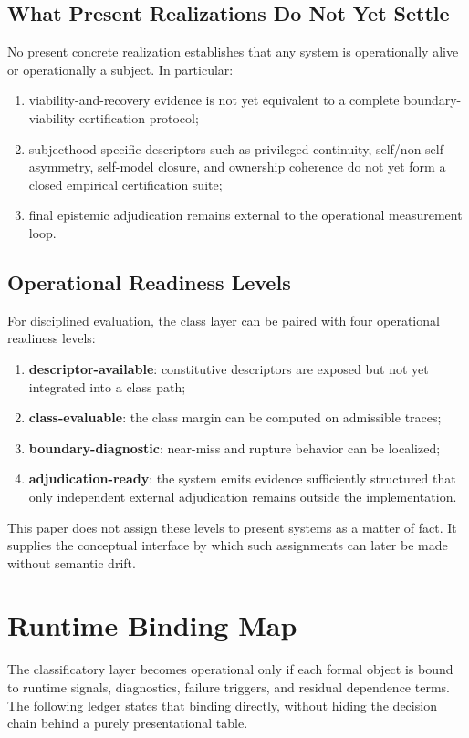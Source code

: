 \documentclass[11pt,a4paper]{article}
\theoremstyle{definition}
\begin{document}
\subsection{What Present Realizations Do Not Yet Settle}
No present concrete realization establishes that any system is operationally alive or operationally a subject. In particular:
\begin{enumerate}[leftmargin=1.5em]
\item viability-and-recovery evidence is not yet equivalent to a complete boundary-viability certification protocol;
\item subjecthood-specific descriptors such as privileged continuity, self/non-self asymmetry, self-model closure, and ownership coherence do not yet form a closed empirical certification suite;
\item final epistemic adjudication remains external to the operational measurement loop.
\end{enumerate}

\subsection{Operational Readiness Levels}
For disciplined evaluation, the class layer can be paired with four operational readiness levels:
\begin{enumerate}[leftmargin=1.5em]
\item \textbf{descriptor-available}: constitutive descriptors are exposed but not yet integrated into a class path;
\item \textbf{class-evaluable}: the class margin can be computed on admissible traces;
\item \textbf{boundary-diagnostic}: near-miss and rupture behavior can be localized;
\item \textbf{adjudication-ready}: the system emits evidence sufficiently structured that only independent external adjudication remains outside the implementation.
\end{enumerate}
This paper does not assign these levels to present systems as a matter of fact. It supplies the conceptual interface by which such assignments can later be made without semantic drift.

\section{Runtime Binding Map}
The classificatory layer becomes operational only if each formal object is bound to runtime signals, diagnostics, failure triggers, and residual dependence terms. The following ledger states that binding directly, without hiding the decision chain behind a purely presentational table.
\end{document}
